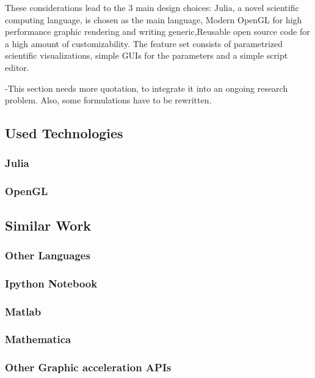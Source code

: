 These considerations lead to the 3 main design choices:
Julia, a novel scientific computing language, is chosen as the main language, Modern OpenGL for high performance graphic rendering and writing generic,Reusable open source code for a high amount of customizability.
The feature set consists of parametrized scientific visualizations, simple GUIs for the parameters and a simple script editor.

-This section needs more quotation, to integrate it into an ongoing research problem. Also, some formulations have to be rewritten.
\pagebreak

\subsection{Used Technologies}

\subsubsection{Julia}
\subsubsection{OpenGL}


\subsection{Similar Work}

\subsubsection{Other Languages}
\subsubsection{Ipython Notebook}
\subsubsection{Matlab}
\subsubsection{Mathematica}
\subsubsection{Other Graphic acceleration APIs}